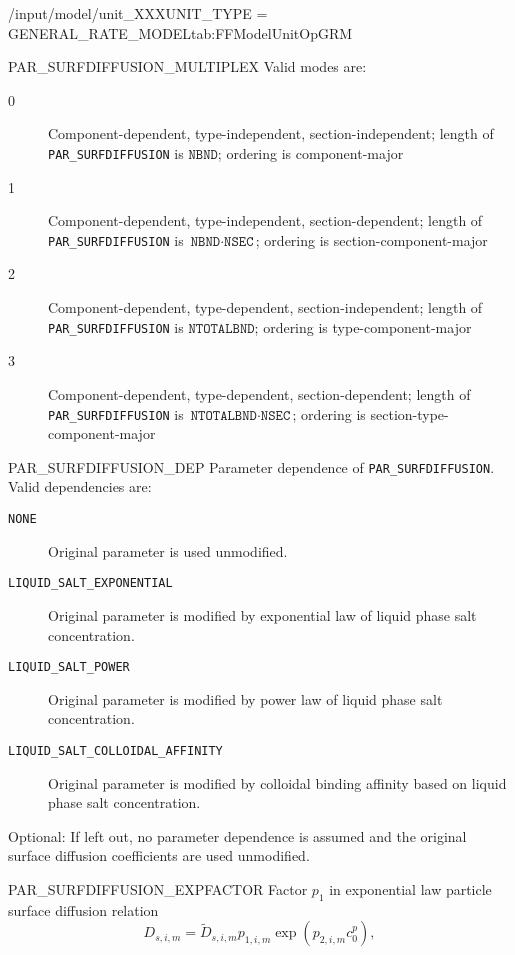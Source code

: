 \begin{condsubgroup}{/input/model/unit\_XXX}{UNIT\_TYPE = GENERAL\_RATE\_MODEL}{tab:FFModelUnitOpGRM}
\begin{dataset}[unit=--,type=int,range={$\{0, \dots, 3 \}$},length={1}]{PAR\_SURFDIFFUSION\_MULTIPLEX}
    Valid modes are:
    \begin{description}
      \item[0] Component-dependent, type-independent, section-independent; length of \texttt{PAR\_SURFDIFFUSION} is $\texttt{NBND}$; ordering is component-major
      \item[1] Component-dependent, type-independent, section-dependent; length of \texttt{PAR\_SURFDIFFUSION} is $\texttt{NBND} \cdot \texttt{NSEC}$; ordering is section-component-major
      \item[2] Component-dependent, type-dependent, section-independent; length of \texttt{PAR\_SURFDIFFUSION} is $\texttt{NTOTALBND}$; ordering is type-component-major
      \item[3] Component-dependent, type-dependent, section-dependent; length of \texttt{PAR\_SURFDIFFUSION} is $\texttt{NTOTALBND} \cdot \texttt{NSEC}$; ordering is section-type-component-major
    \end{description}\vspace{-\baselineskip}
  \end{dataset}
  \begin{dataset}[unit=--,type=string,length={$1$ / \texttt{NPARTYPE}}]{PAR\_SURFDIFFUSION\_DEP}
    Parameter dependence of \texttt{PAR\_SURFDIFFUSION}.
    Valid dependencies are:
    \begin{description}
      \item[\texttt{NONE}] Original parameter is used unmodified.
      \item[\texttt{LIQUID_SALT_EXPONENTIAL}] Original parameter is modified by exponential law of liquid phase salt concentration.
      \item[\texttt{LIQUID_SALT_POWER}] Original parameter is modified by power law of liquid phase salt concentration.
      \item[\texttt{LIQUID_SALT_COLLOIDAL_AFFINITY}] Original parameter is modified by colloidal binding affinity based on liquid phase salt concentration.
    \end{description}
    Optional: If left out, no parameter dependence is assumed and the original surface diffusion coefficients are used unmodified.
  \end{dataset}
  \begin{dataset}[unit=--,type=double,range={$\geq 0$},length={\texttt{NBND}}]{PAR\_SURFDIFFUSION\_EXPFACTOR}
    Factor $p_1$ in exponential law particle surface diffusion relation
    \begin{equation*}
      D_{s,i,m} = \tilde{D}_{s,i,m} p_{1,i,m} \exp(p_{2,i,m} c^p_0),

\end{equation*}
\end{dataset}
\end{condsubgroup}
